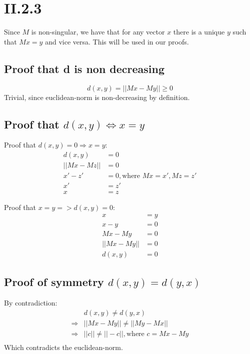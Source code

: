 \documentclass[a4paper,10pt]{article}
\begin{document}
\section*{II.2.3}
Since $M$ is non-singular, we have that for any vector $x$ there is a unique $y$ such that $Mx=y$ and vice versa. This will be used in our proofs.\\

\subsection*{Proof that d is non decreasing}
\[
d(x,y)=||Mx-My||\geq0
\]
Trivial, since euclidean-norm is non-decreasing by definition.\\

\subsection*{Proof that $d(x,y) \iff x=y$}
Proof that $d(x,y)=0 \Rightarrow x=y$:
\begin{align*}
d(x,y)&=0\\
||Mx-Mz||&=0\\
x'-z'&=0, \text{where }Mx=x', Mz=z'\\
x'&=z'\\
x&=z
\end{align*}

Proof that $x=y => d(x,y)=0$:
\begin{align*}
x&=y\\
x-y&=0\\
Mx-My&=0\\
||Mx-My||&=0\\
d(x,y)&=0
\end{align*}
\subsection*{Proof of symmetry $d(x,y)=d(y,x)$}
By contradiction:
\begin{align*}
&d(x,y)\neq d(y,x)\\
\Rightarrow &||Mx-My||\neq ||My-Mx||\\
\Rightarrow &||c||\neq ||-c||, \text{where } c= Mx-My\\
\end{align*}
Which contradicts the euclidean-norm.
\end{document}
